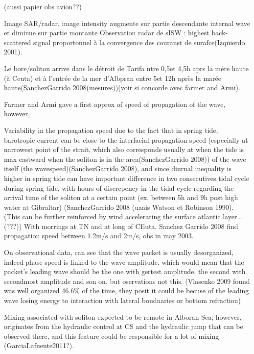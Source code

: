 (aussi papier obs avion??)



Image SAR/radar, image intensity augmente sur partie descendante internal wave et diminue sur partie montante
Observation radar de sISW : highest back-scattered signal proportonnel à la convergence des couranst de surafce(Izquierdo 2001).

Le bore/soliton arrive dans le détroit de Tarifa ntre 0,5et 4,5h aprs la mére haute (à Ceuta) et à l’entrée de la mer d’Albpran entre 5et 12h après la marée haute(SanchezGarrido 2008(mesures))(voir si concorde avec farmer and Armi).

Farmer and Armi gave a first approx of speed of propagation of the wave, however, 

Variability in the propagation speed due to the fact that in spring tide, barotropic current can be close to the interfacial propagation speed (especially at narrowest point of the strait, which also corresponds usually at when the tide is max eastward when the soliton is in the area(SanchezGarrido 2008)) of the wave itself (the wavespeed)(SanchezGarrido 2008), and since diurnal inequality is higher in spring tide can have important difference in two consecutives tidal cycle during spring tide, with hours of discrepency in the tidal cycle regarding the arrival time of the soliton at a certain point (ex. between 5h and 9h post high water at Gibraltar) (SanchezGarrido 2008  (uaais Watson et Robinson 1990). (This can be further reinforced by wind accelerating the surface atlantic layer...(???))
With morrings at TN and at long of CEuta, Sanchez Garrido 2008 find propagation speed between 1.2m/s and 2m/s, obs in may 2003.

On observational data, can see that the wave packet is usually desorganized, indeed phase speed is linked to the wave amplitude, which would mean that the packet's leading wave should be the one with gertest amplitude, the second with secondmost amplitude and son on, but oservations not this. (Vlasenko 2009 found was well organized 46.6\% of the time, they posit it could be becuse of the leading wave losing energy to interaction with lateral boudnaries or bottom refraction)


Mixing associated with soliton expected to be remote in Alboran Sea; however, originates from the hydraulic control at CS and the hydraulic jump that can be observed there, and this feature could be responsible for a lot of mixing (GarciaLafuente2011?).

